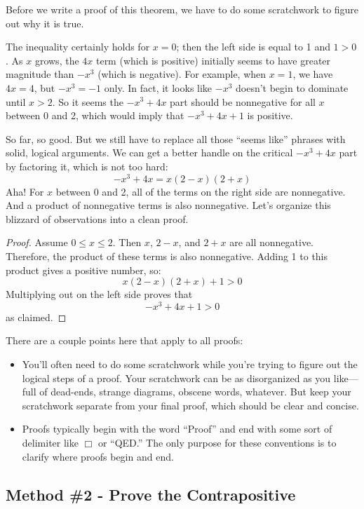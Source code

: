Before we write a proof of this theorem, we have to do some
scratchwork to figure out why it is true.

The inequality certainly holds for $x = 0$; then the left side is
equal to 1 and $1 > 0$.  As $x$ grows, the $4x$ term (which is
positive) initially seems to have greater magnitude than $-x^3$ (which
is negative).  For example, when $x = 1$, we have $4x = 4$, but $-x^3
= -1$ only.  In fact, it looks like $-x^3$ doesn't begin to dominate
until $x > 2$.  So it seems the $-x^3 + 4x$ part should be nonnegative
for all $x$ between 0 and 2, which would imply that $-x^3 + 4x + 1$ is
positive.

So far, so good.  But we still have to replace all those ``seems
like'' phrases with solid, logical arguments.  We can get a better
handle on the critical $-x^3 + 4x$ part by factoring it, which is not
too hard:
%
\[
-x^3 + 4x = x (2 - x)(2 + x)
\]
%
Aha!  For $x$ between 0 and 2, all of the terms on the right side are
nonnegative.  And a product of nonnegative terms is also nonnegative.
Let's organize this blizzard of observations into a clean proof.

\begin{proof}
Assume $0 \leq x \leq 2$.  Then $x$, $2 - x$, and $2 + x$ are all
nonnegative.  Therefore, the product of these terms is also
nonnegative.  Adding 1 to this product gives a positive number, so:
%
\[
x (2 - x)(2 + x) + 1 > 0
\]
%
Multiplying out on the left side proves that
%
\[
-x^3 + 4x + 1 > 0
\]
%
as claimed.
\end{proof}

There are a couple points here that apply to all proofs:
%
\begin{itemize}

\item You'll often need to do some scratchwork while you're trying to
figure out the logical steps of a proof.  Your scratchwork can be as
disorganized as you like---full of dead-ends, strange diagrams,
obscene words, whatever.  But keep your scratchwork separate from your
final proof, which should be clear and concise.

\item Proofs typically begin with the word ``Proof'' and end with some
sort of delimiter like $\Box$ or ``QED.''  The only purpose for
these conventions is to clarify where proofs begin and end.

\end{itemize}

\subsection{Method \#2 - Prove the Contrapositive}

